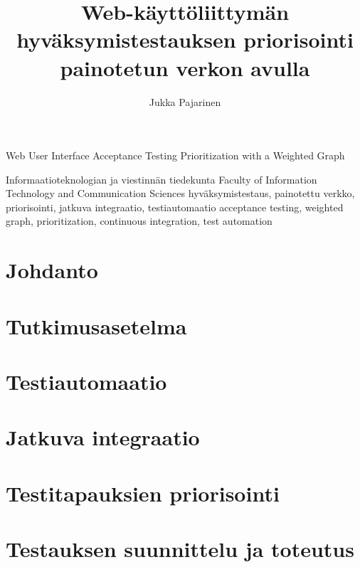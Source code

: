 \documentclass[finnish, authoryear]{config/tauthesis}
\theoremstyle{definition}
\begin{document}
\frontmatter
\title
  {Web-käyttöliittymän hyväksymistestauksen priorisointi painotetun verkon avulla}
  {Web User Interface Acceptance Testing Prioritization with a Weighted Graph}
\subtitle{}{}
\author{Jukka Pajarinen}
\facultyname
  {Informaatioteknologian ja viestinnän tiedekunta}
  {Faculty of Information Technology and Communication Sciences}
\keywords
  {hyväksymistestaus, painotettu verkko, priorisointi, jatkuva integraatio, testiautomaatio}
  {acceptance testing, weighted graph, prioritization, continuous integration, test automation}
\maketitle
{}
\tableofcontents
\glossary

\mainmatter
\chapter{Johdanto}
\label{ch:johdanto}

\chapter{Tutkimusasetelma}
\label{ch:tutkimusasetelma}

\chapter{Testiautomaatio}
\label{ch:testiautomaatio}

\chapter{Jatkuva integraatio}
\label{ch:jatkuva_integraatio}

\chapter{Testitapauksien priorisointi}
\label{ch:testitapauksien_priorisointi}

\chapter{Testauksen suunnittelu ja toteutus}
\label{ch:testauksen_suunnittelu_ja_toteutus}

\end{document}
